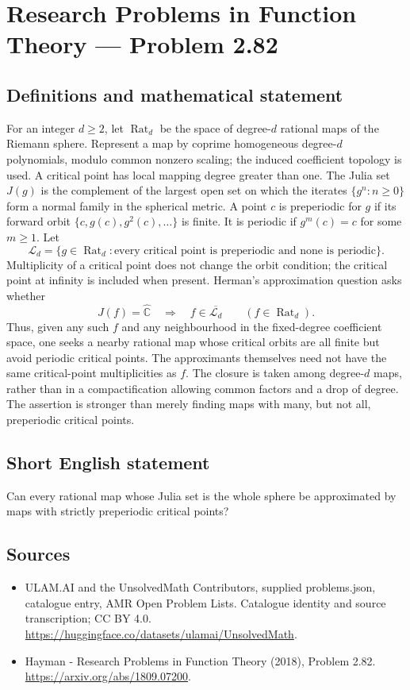 \documentclass[11pt,a4paper]{article}
\begin{document}
\section*{Research Problems in Function Theory — Problem 2.82}\label{statement}

\subsection{Definitions and mathematical statement}
For an integer $d\ge2$, let $\operatorname{Rat}_d$ be the space of degree-$d$ rational maps of the Riemann sphere. Represent a map by coprime homogeneous degree-$d$ polynomials, modulo common nonzero scaling; the induced coefficient topology is used. A critical point has local mapping degree greater than one. The Julia set $J(g)$ is the complement of the largest open set on which the iterates $\{g^n:n\ge0\}$ form a normal family in the spherical metric.
A point $c$ is preperiodic for $g$ if its forward orbit
$\{c,g(c),g^2(c),\ldots\}$ is finite. It is periodic if $g^m(c)=c$ for some $m\ge1$. Let
\[
\mathcal L_d=\{g\in\operatorname{Rat}_d:
\text{every critical point is preperiodic and none is periodic}\}.
\]
Multiplicity of a critical point does not change the orbit condition; the critical point at infinity is included when present.
Herman's approximation question asks whether
\[
J(f)=\widehat{\mathbb C}\quad\Longrightarrow\quad
f\in\overline{\mathcal L_d}
\qquad(f\in\operatorname{Rat}_d).
\]
Thus, given any such $f$ and any neighbourhood in the fixed-degree coefficient space, one seeks a nearby rational map whose critical orbits are all finite but avoid periodic critical points. The approximants themselves need not have the same critical-point multiplicities as $f$. The closure is taken among degree-$d$ maps, rather than in a compactification allowing common factors and a drop of degree. The assertion is stronger than merely finding maps with many, but not all, preperiodic critical points.
\subsection{Short English statement}
Can every rational map whose Julia set is the whole sphere be approximated by maps with strictly preperiodic critical points?
\subsection{Sources}
\begin{itemize}
\item[S1] ULAM.AI and the UnsolvedMath Contributors, supplied problems.json, catalogue entry, AMR Open Problem Lists. Catalogue identity and source transcription; CC BY 4.0.
\url{https://huggingface.co/datasets/ulamai/UnsolvedMath}.
\item[S2] Hayman - Research Problems in Function Theory (2018), Problem 2.82. 
\url{https://arxiv.org/abs/1809.07200}.
\end{itemize}
\end{document}
